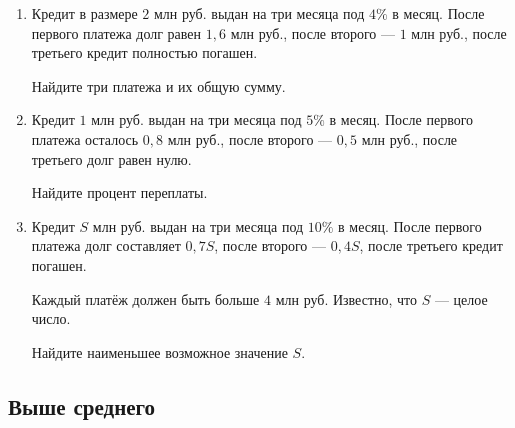\documentclass[a4paper,12pt]{article}
\begin{document}
\begin{enumerate}[leftmargin=2em,itemsep=1.15em]

\item
Кредит в размере \(2\) млн руб. выдан на три месяца под \(4\%\) в месяц.
После первого платежа долг равен \(1{,}6\) млн руб., после второго ---
\(1\) млн руб., после третьего кредит полностью погашен.

Найдите три платежа и их общую сумму.

\item
Кредит \(1\) млн руб. выдан на три месяца под \(5\%\) в месяц.
После первого платежа осталось \(0{,}8\) млн руб., после второго ---
\(0{,}5\) млн руб., после третьего долг равен нулю.

Найдите процент переплаты.

\item
Кредит \(S\) млн руб. выдан на три месяца под \(10\%\) в месяц.
После первого платежа долг составляет \(0{,}7S\), после второго ---
\(0{,}4S\), после третьего кредит погашен.

Каждый платёж должен быть больше \(4\) млн руб.
Известно, что \(S\) --- целое число.

Найдите наименьшее возможное значение \(S\).

\end{enumerate}

\subsection*{Выше среднего}
\end{document}
